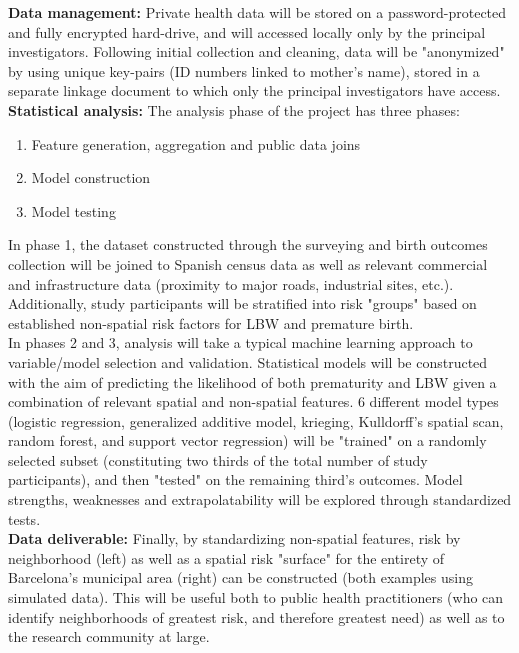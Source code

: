 \documentclass{article}
\begin{document}
\begin{multicols}{2}
\noindent \textbf{Data management:} Private health data will be stored on a password-protected and fully encrypted hard-drive, and will accessed locally only by the principal investigators.  Following initial collection and cleaning, data will be "anonymized" by using unique key-pairs (ID numbers linked to mother's name), stored in a separate linkage document to which only the principal investigators have access. \\ 

\noindent \textbf{Statistical analysis:} The analysis phase of the project has three phases: \begin{enumerate}
\item Feature generation, aggregation and public data joins
\item Model construction 
\item Model testing
\end{enumerate}

In phase 1, the dataset constructed through the surveying and birth outcomes collection will be joined to Spanish census data as well as relevant commercial and infrastructure data (proximity to major roads, industrial sites, etc.). Additionally, study participants will be stratified into risk "groups" based on established non-spatial risk factors for LBW and premature birth. \\

In phases 2 and 3, analysis will take a typical machine learning approach to variable/model selection and validation.  Statistical models will be constructed with the aim of predicting the likelihood of both prematurity and LBW given a combination of relevant spatial and non-spatial features.  6 different model types (logistic regression, generalized additive model, krieging, Kulldorff's spatial scan, random forest, and support vector regression) will be "trained" on a randomly selected subset (constituting two thirds of the total number of study participants), and then "tested" on the remaining third's outcomes.  Model strengths, weaknesses and extrapolatability will be explored through standardized tests. \\

\noindent \textbf{Data deliverable:} Finally, by standardizing non-spatial features, risk by neighborhood (left) as well as a spatial risk "surface" for the entirety of Barcelona's municipal area (right) can be constructed (both examples using simulated data).  This will be useful both to public health practitioners (who can identify neighborhoods of greatest risk, and therefore greatest need) as well as to the research community at large. 






\end{multicols}
\end{document}
